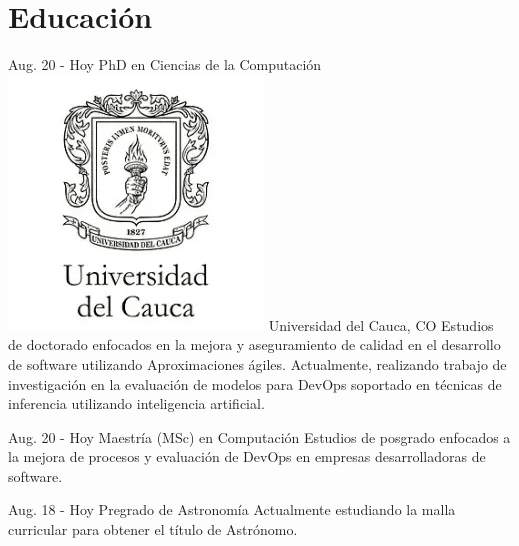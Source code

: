 \documentclass[]{cv-class}
\begin{document}
\section{Educación}
\begin{entrylist}
	\entry
	{Aug. 20 - Hoy}
	{PhD en Ciencias de la Computación}
	{{\includegraphics[scale=0.05]{img/unicauca-logo.png}} Universidad del Cauca, CO} 
	{Estudios de doctorado enfocados en la mejora y aseguramiento de calidad en el desarrollo de software utilizando Aproximaciones ágiles. Actualmente, realizando trabajo de investigación en la evaluación de modelos para DevOps soportado en técnicas de inferencia utilizando inteligencia artificial.}
	
	\entry
	{Aug. 20 - Hoy}
	{Maestría (MSc) en Computación}
	{ }
	{Estudios de posgrado enfocados a la mejora de procesos y evaluación de DevOps en empresas desarrolladoras de software.}
	
	\entry
	{Aug. 18 - Hoy}
	{Pregrado de Astronomía}
	{ }
	{Actualmente estudiando la malla curricular para obtener el título de Astrónomo.}
	

\end{entrylist}
\end{document}
